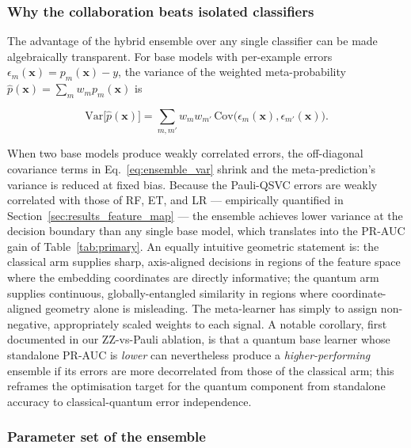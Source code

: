 \documentclass[twocolumn,10pt]{article}
\begin{document}
\subsubsection*{Why the collaboration beats isolated classifiers}

The advantage of the hybrid ensemble over any single classifier can be made algebraically transparent. For base models with per-example errors $\epsilon_{m}(\mathbf{x}) = p_{m}(\mathbf{x}) - y$, the variance of the weighted meta-probability $\hat{p}(\mathbf{x}) = \sum_{m} w_{m} p_{m}(\mathbf{x})$ is

\begin{equation}
\mathrm{Var}\bigl[\hat{p}(\mathbf{x})\bigr] = \sum_{m,m'} w_{m} w_{m'}\,\mathrm{Cov}\bigl(\epsilon_{m}(\mathbf{x}), \epsilon_{m'}(\mathbf{x})\bigr).
\label{eq:ensemble_var}
\end{equation}

When two base models produce weakly correlated errors, the off-diagonal covariance terms in Eq.~\eqref{eq:ensemble_var} shrink and the meta-prediction's variance is reduced at fixed bias. Because the Pauli-QSVC errors are weakly correlated with those of RF, ET, and LR --- empirically quantified in Section~\ref{sec:results_feature_map} --- the ensemble achieves lower variance at the decision boundary than any single base model, which translates into the PR-AUC gain of Table~\ref{tab:primary}. An equally intuitive geometric statement is: the classical arm supplies sharp, axis-aligned decisions in regions of the feature space where the embedding coordinates are directly informative; the quantum arm supplies continuous, globally-entangled similarity in regions where coordinate-aligned geometry alone is misleading. The meta-learner has simply to assign non-negative, appropriately scaled weights to each signal. A notable corollary, first documented in our ZZ-vs-Pauli ablation, is that a quantum base learner whose standalone PR-AUC is \emph{lower} can nevertheless produce a \emph{higher-performing} ensemble if its errors are more decorrelated from those of the classical arm; this reframes the optimisation target for the quantum component from standalone accuracy to classical-quantum error independence.

\subsubsection*{Parameter set of the ensemble}
\end{document}
